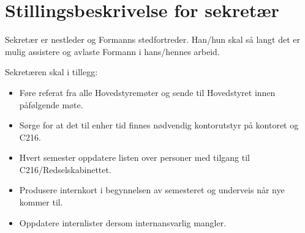 \section{Stillingsbeskrivelse for sekretær}

Sekretær er nestleder og Formanns stedfortreder.
Han/hun skal så langt det er mulig assistere og
avlaste Formann i hans/hennes arbeid.

Sekretæren skal i tillegg:
\begin{itemize}
\item Føre referat fra alle Hovedstyremøter og
      sende til Hovedstyret innen påfølgende møte.
\item Sørge for at det til enher tid finnes nødvendig
      kontorutstyr på kontoret og C216.
\end{itemize}

\begin{itemize}
\item Hvert semester oppdatere listen over personer med
      tilgang til C216/Redselskabinettet.
\item Produsere internkort i begynnelsen av semesteret og
      underveis når nye kommer til.
\item Oppdatere internlister dersom internansvarlig mangler.
\end{itemize}
